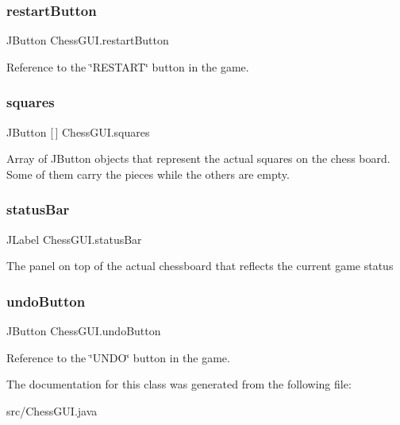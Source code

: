 \subsubsection{\texorpdfstring{restart\+Button}{restartButton}}
{\footnotesize\ttfamily J\+Button Chess\+G\+U\+I.\+restart\+Button\hspace{0.3cm}{\ttfamily [protected]}}

Reference to the \char`\"{}\+R\+E\+S\+T\+A\+R\+T\char`\"{} button in the game. \mbox{\label{class_chess_g_u_i_a9f139dfcfa39c07e122f5d32ed121e02}} 
\subsubsection{\texorpdfstring{squares}{squares}}
{\footnotesize\ttfamily J\+Button \mbox{[}$\,$\mbox{]} Chess\+G\+U\+I.\+squares\hspace{0.3cm}{\ttfamily [protected]}}

Array of J\+Button objects that represent the actual squares on the chess board. Some of them carry the pieces while the others are empty. \mbox{\label{class_chess_g_u_i_a02cdba2c0212fa5482194e1318d5089e}} 
\subsubsection{\texorpdfstring{status\+Bar}{statusBar}}
{\footnotesize\ttfamily J\+Label Chess\+G\+U\+I.\+status\+Bar\hspace{0.3cm}{\ttfamily [protected]}}

The panel on top of the actual chessboard that reflects the current game status \mbox{\label{class_chess_g_u_i_a9ca5fa7a1828101912aa1774fa2f353c}} 
\subsubsection{\texorpdfstring{undo\+Button}{undoButton}}
{\footnotesize\ttfamily J\+Button Chess\+G\+U\+I.\+undo\+Button\hspace{0.3cm}{\ttfamily [protected]}}

Reference to the \char`\"{}\+U\+N\+D\+O\char`\"{} button in the game. 

The documentation for this class was generated from the following file\+:\begin{DoxyCompactItemize}
\item 
src/Chess\+G\+U\+I.\+java\end{DoxyCompactItemize}
